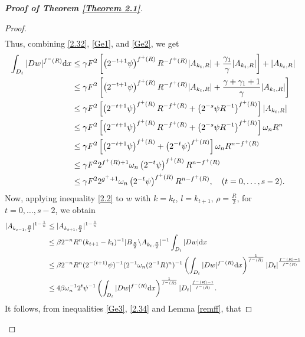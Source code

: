 \documentclass[10pt,reqno]{amsart}
\newcommand *\w{^\wedge}
\theoremstyle{definition}
\numberwithin{equation}{section}
\begin{document}
\begin{proof}[\textbf{Proof of Theorem \ref{Theorem 2.1}}]
\begin{proof}
\begin{align}
\end{align}
Thus, combining  \eqref{2.32}, \eqref{Ge1}, and \eqref{Ge2}, we get
\begin{align}\label{Ge3}
\begin{split}
  \int_{D_t} |Dw|^{f^-(R)}{\rm d}x & \leq \gamma F^2\left[\left(2^{-t+1}\psi\right)^{f^+(R)}R^{-f^+(R)}|A_{k_t, R}|+\frac{\gamma_1}{\gamma} |A_{k_t, R}|\right]+|A_{k_t, R}|\\
  & \leq \gamma F^2\left[\left(2^{-t+1}\psi\right)^{f^+(R)}R^{-f^+(R)}|A_{k_t, R}|+\frac{\gamma+\gamma_1+1}{\gamma} |A_{k_t, R}|\right]\\
  &  \leq\gamma F^2\left[\left(2^{-t+1}\psi\right)^{f^+(R)}R^{-f^+(R)}+\left( 2^{-s}\psi R^{-1}\right)^{f^+(R)} \right]|A_{k_t, R}|\\
  &\leq  \gamma F^2\left[\left(2^{-t+1}\psi\right)^{f^+(R)}R^{-f^+(R)}+\left( 2^{-s}\psi R^{-1}\right)^{f^+(R)} \right]\omega_n R^n\\
  &\leq  \gamma F^2\left[\left(2^{-t+1}\psi\right)^{f^+(R)}+\left(2^{-t}\psi\right)^{f^+(R)} \right]\omega_n R^{n-f^+(R)}\\
  &\leq  \gamma F^22^{f^+(R)+1}\omega_n\left(2^{-t}\psi\right)^{f^+(R)} R^{n-f^+(R)}\\
  &\leq  \gamma F^22^{g^++1}\omega_n\left(2^{-t}\psi\right)^{f^+(R)} R^{n-f^+(R)},\quad (t = 0, \ldots, s - 2).
  \end{split}
\end{align}
Now, applying inequality \eqref{2.2} to \(w\) with \(k = k_t\), \(l = k_{t+1}\), \(\rho = \frac{R}{2}\), for \(t = 0, \ldots, s - 2\), we obtain
\begin{align}\label{2.34}
\begin{split}
|A_{k_{s-1}, \frac{R}{2}}|^{1-\frac{1}{n}} &\leq |A_{k_{t+1}, \frac{R}{2}}|^{1-\frac{1}{n}}\\
&\leq \beta 2^{-n} R^n (k_{t+1} - k_t)^{-1} |B_{\frac{R}{2}} \backslash A_{k_t, \frac{R}{2}}|^{-1} \int_{D_t} |Dw| {\rm d}x\\
&\leq \beta 2^{-n} R^n (2^{-(t+1)}\psi)^{-1} (2^{-1} \omega_n (2^{-1} R)^n)^{-1} \left( \int_{D_t} |Dw|^{f^-(R)} {\rm d}x \right)^{\frac{1}{f^-(R)}} |D_t|^{\frac{f^-(R)-1}{f^-(R)}}\\
&\leq 4 \beta \omega_n^{-1} 2^t \psi^{-1} \left( \int_{D_t} |Dw|^{f^-(R)} {\rm d}x \right)^{\frac{1}{f^-(R)}} |D_t|^{\frac{f^-(R)-1}{f^-(R)}}.
\end{split}
\end{align}
It follows, from inequalities \eqref{Ge3}, \eqref{2.34} and Lemma \ref{remff}, that

\end{proof}
\end{proof}
\end{document}
